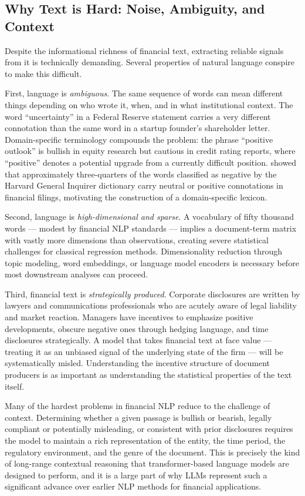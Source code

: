 \subsection{Why Text is Hard: Noise, Ambiguity, and Context}
\label{subsec:text-challenges}

Despite the informational richness of financial text, extracting
reliable signals from it is technically demanding.  Several properties
of natural language conspire to make this difficult.

First, language is \emph{ambiguous}.  The same sequence of words can
mean different things depending on who wrote it, when, and in what
institutional context.  The word ``uncertainty'' in a Federal Reserve
statement carries a very different connotation than the same word in a
startup founder's shareholder letter.  Domain-specific terminology
compounds the problem: the phrase ``positive outlook'' is bullish in
equity research but cautious in credit rating reports, where ``positive''
denotes a potential upgrade from a currently difficult position.
\textcite{loughran2011liability} showed that approximately three-quarters
of the words classified as negative by the Harvard General Inquirer
dictionary carry neutral or positive connotations in financial filings,
motivating the construction of a domain-specific lexicon.

Second, language is \emph{high-dimensional and sparse}.  A vocabulary of
fifty thousand words --- modest by financial NLP standards --- implies a
document-term matrix with vastly more dimensions than observations,
creating severe statistical challenges for classical regression methods.
Dimensionality reduction through topic modeling, word embeddings, or
language model encoders is necessary before most downstream analyses
can proceed.

Third, financial text is \emph{strategically produced}.  Corporate
disclosures are written by lawyers and communications professionals
who are acutely aware of legal liability and market reaction.  Managers
have incentives to emphasize positive developments, obscure negative
ones through hedging language, and time disclosures strategically.
A model that takes financial text at face value --- treating it as
an unbiased signal of the underlying state of the firm --- will be
systematically misled.  Understanding the incentive structure of document
producers is as important as understanding the statistical properties
of the text itself.

\begin{remark}
\label{rem:context-financial-text}
Many of the hardest problems in financial NLP reduce to the challenge
of context.  Determining whether a given passage is bullish or bearish,
legally compliant or potentially misleading, or consistent with prior
disclosures requires the model to maintain a rich representation of the
entity, the time period, the regulatory environment, and the genre of
the document.  This is precisely the kind of long-range contextual
reasoning that transformer-based language models are designed to perform,
and it is a large part of why LLMs represent such a significant advance
over earlier NLP methods for financial applications.
\end{remark}

